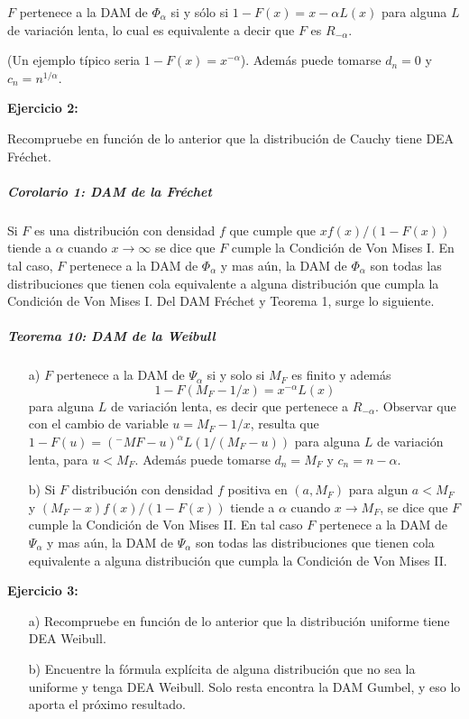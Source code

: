 \documentclass[
  oneside]{article}
\begin{document}
\(F\) pertenece a la DAM de \(\Phi_{\alpha}\) si y sólo si
\(1-F(x)=x-\alpha L(x)\) para alguna \(L\) de variación lenta, lo cual
es equivalente a decir que \(F\) es \(R_{-\alpha}\).

(Un ejemplo típico seria \(1-F(x)=x^{-\alpha}\)). Además puede tomarse
\(d_n=0\) y \(c_n= n^{1/\alpha}\).

\textbf{Ejercicio 2:}

Recompruebe en función de lo anterior que la distribución de Cauchy
tiene DEA Fréchet.

\hypertarget{corolario-1-dam-de-la-fruxe9chet}{%
\subparagraph{Corolario 1: DAM de la
Fréchet}\label{corolario-1-dam-de-la-fruxe9chet}}

Si \(F\) es una distribución con densidad \(f\) que cumple que
\(xf(x)/(1-F(x))\) tiende a \(\alpha\) cuando \(x \rightarrow \infty\)
se dice que \(F\) cumple la Condición de Von Mises I. En tal caso, \(F\)
pertenece a la DAM de \(\Phi_{\alpha}\) y mas aún, la DAM de
\(\Phi_{\alpha}\) son todas las distribuciones que tienen cola
equivalente a alguna distribución que cumpla la Condición de Von Mises
I. Del DAM Fréchet y Teorema 1, surge lo siguiente.

\hypertarget{teorema-10-dam-de-la-weibull}{%
\subparagraph{Teorema 10: DAM de la
Weibull}\label{teorema-10-dam-de-la-weibull}}

\begin{itemize}
\item [a)] $F$ pertenece a la DAM de $\Psi_{\alpha}$ si y solo si $M_F$ es finito y además $$1-F(M_F -1/x)=x^{-\alpha} L(x)$$ para alguna
$L$ de variación lenta, es decir que pertenece a $R_{-\alpha}$. Observar que con el cambio de variable $u=M_F -1/x$,
resulta que $1-F(u)=(^{-}MF -u)^{\alpha} L(1/(M_F -u))$ para alguna $L$ de variación lenta, para $u< M_F$. Además puede tomarse $d_n= M_F$ y $c_n= n-\alpha$.
\item [b)] Si $F$ distribución con densidad $f$ positiva en $(a,M_F)$ para algun $a< M_F$ y $(M_F -x)f(x)/(1-F(x))$ tiende a $\alpha$ cuando $x\rightarrow M_F$, se dice que $F$ cumple la Condición de Von Mises II. En tal caso $F$ pertenece a la DAM de $\Psi_{\alpha}$ y mas aún, la DAM de $\Psi_{\alpha}$ son todas las distribuciones que tienen cola equivalente a alguna distribución que cumpla la Condición de Von Mises II.
\end{itemize}

\textbf{Ejercicio 3:}

\begin{itemize}
\item[a)] Recompruebe en función de lo anterior que la distribución uniforme tiene DEA Weibull. 
\item[b)] Encuentre la fórmula explícita de alguna distribución que no sea la uniforme y tenga DEA Weibull.
Solo resta encontra la DAM Gumbel, y eso lo aporta el próximo resultado.
\end{itemize}
\end{document}
